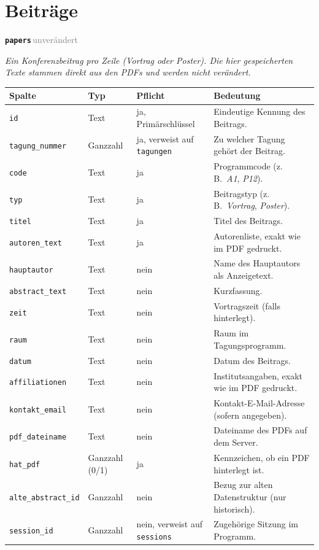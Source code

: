 \documentclass[11pt,a4paper,parskip=half-]{scrartcl}
\newcommand{\tabhead}[1]{\textsf{\textbf{\small\color{accent}#1}}}
\newcommand{\tagunv}{\textcolor{gray}{\sffamily\footnotesize\,unverändert\,}}
\newcommand{\tabletitle}[2]{%
  \par\vspace{1.1em}%
  \noindent%
  \begin{tcolorbox}[
    enhanced,
    colback=tabletitlebg,
    colframe=tabletitlebg,
    arc=2pt,
    boxrule=0pt,
    left=10pt, right=10pt, top=4pt, bottom=4pt,
    before skip=0pt, after skip=6pt
  ]
    {\sffamily\large\bfseries\color{white}\texttt{#1}}\hfill{#2}
  \end{tcolorbox}%
  \par\nobreak%
}
\begin{document}
\section{Beiträge}

\tabletitle{papers}{\tagunv}

\textit{Ein Konferenzbeitrag pro Zeile (Vortrag oder Poster).
Die hier gespeicherten Texte stammen direkt aus den PDFs und werden nicht
verändert.}

\begin{tabularx}{\linewidth}{L{3.6cm} L{1.9cm} L{3.0cm} X}
\toprule
\tabhead{Spalte} & \tabhead{Typ} & \tabhead{Pflicht} & \tabhead{Bedeutung} \\
\midrule
\texttt{id}               & Text     & ja, Primärschlüssel & Eindeutige Kennung des Beitrags. \\
\texttt{tagung\_nummer}   & Ganzzahl & ja, verweist auf \texttt{tagungen} & Zu welcher Tagung gehört der Beitrag. \\
\texttt{code}             & Text     & ja & Programmcode (z.\,B.~\textit{A1}, \textit{P12}). \\
\texttt{typ}              & Text     & ja & Beitragstyp (z.\,B.~\textit{Vortrag}, \textit{Poster}). \\
\texttt{titel}            & Text     & ja & Titel des Beitrags. \\
\texttt{autoren\_text}    & Text     & ja & Autorenliste, exakt wie im PDF gedruckt. \\
\texttt{hauptautor}       & Text     & nein & Name des Hauptautors als Anzeigetext. \\
\texttt{abstract\_text}   & Text     & nein & Kurzfassung. \\
\texttt{zeit}             & Text     & nein & Vortragszeit (falls hinterlegt). \\
\texttt{raum}             & Text     & nein & Raum im Tagungsprogramm. \\
\texttt{datum}            & Text     & nein & Datum des Beitrags. \\
\texttt{affiliationen}    & Text     & nein & Institutsangaben, exakt wie im PDF gedruckt. \\
\texttt{kontakt\_email}   & Text     & nein & Kontakt-E-Mail-Adresse (sofern angegeben). \\
\texttt{pdf\_dateiname}   & Text     & nein & Dateiname des PDFs auf dem Server. \\
\texttt{hat\_pdf}         & Ganzzahl (0/1) & ja & Kennzeichen, ob ein PDF hinterlegt ist. \\
\texttt{alte\_abstract\_id} & Ganzzahl & nein & Bezug zur alten Datenstruktur (nur historisch). \\
\texttt{session\_id}      & Ganzzahl & nein, verweist auf \texttt{sessions} & Zugehörige Sitzung im Programm. \\
\bottomrule
\end{tabularx}
\end{document}
